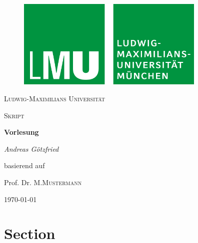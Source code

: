 \documentclass{article}
\begin{document}
\begin{titlepage}
\centering
    \begin{figure}
    \centering
	    \includegraphics[width=90mm]{logo_lmu.jpg}
    \end{figure}
	{\scshape\LARGE Ludwig-Maximilians Universität \par}
	\vspace{1cm}
	{\scshape\Large Skript \par}
	\vspace{1.5cm}
	{\huge\bfseries Vorlesung\par}
	\vspace{2cm}
	{\Large\itshape Andreas Götzfried\par}
    \vfill
	    basierend auf\par
	    Prof. Dr. M.\textsc{Mustermann}
    \vfill
	{\large \today\par}
\end{titlepage}
\tableofcontents{}

\newpage
\section{Section}
\end{document}
